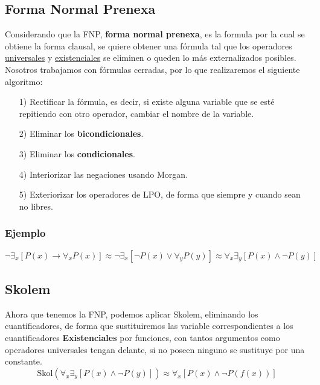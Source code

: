 \subsection{Forma Normal Prenexa}
\noindent Considerando que la FNP, \textbf{forma normal prenexa}, es la formula por la cual se obtiene la forma clausal, se quiere obtener una fórmula tal que los operadores \underline{universales} y \underline{existenciales} se eliminen o queden lo más externalizados posibles. Nosotros trabajamos con fórmulas cerradas, por lo que realizaremos el siguiente algoritmo:
\begin{itemize}
        \item[1)] Rectificar la fórmula, es decir, si existe alguna variable que se esté repitiendo con otro operador, cambiar el nombre de la variable.
        \item[2)] Eliminar los \textbf{bicondicionales}.
        \item[3)] Eliminar los \textbf{condicionales}.
        \item[4)] Interiorizar las negaciones usando Morgan.
        \item[5)] Exteriorizar los operadores de LPO, de forma que siempre y cuando sean no libres.
\end{itemize}
\subsubsection{Ejemplo}
\[
        \boxed{\neg \exists_x \left [ P(x) \rightarrow \forall_x P(x) \right ]\approx \neg \exists_x \left [ \neg P(x) \lor \forall_y P(y) \right ] \approx \forall_x \exists_y \left [ P(x) \land \neg P(y) \right ]}
\]
\subsection{Skolem}
\noindent Ahora que tenemos la FNP, podemos aplicar Skolem, eliminando los cuantificadores, de forma que sustituiremos las variable correspondientes a los cuantificadores \textbf{Existenciales} por funciones, con tantos argumentos como operadores universales tengan delante, si no poseen ninguno se sustituye por una constante.
\[
        \boxed{\text{Skol}\left ( \forall_x \exists_y \left [ P(x) \land \neg P(y) \right ] \right ) \approx \forall_x \left [ P(x) \land \neg P(f(x)) \right ]}
\]
